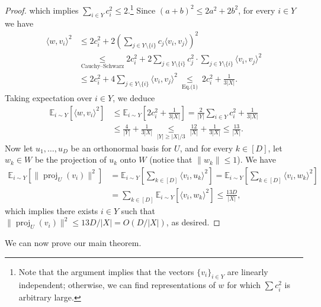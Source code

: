 \begin{proof}
which implies $\sum_{i\in Y}c_i^2\leq2$.\footnote{Note that the argument implies that the vectors $\{v_i\}_{i\in Y}$ are linearly independent; otherwise, we can find representations of $w$ for which $\sum c_i^2$ is arbitrary large.} Since $(a+b)^2\leq2a^2+2b^2$, for every $i\in Y$ we have
\begin{align*}\langle w,v_i\rangle^2&\leq2c_i^2+2\left(\sum_{j\in Y\setminus\{i\}}c_j\langle v_i,v_j\rangle\right)^2\\&\underset{\text{Cauchy--Schwarz}}\leq2c_i^2+2\sum_{j\in Y\setminus\{i\}}c_j^2\cdot\sum_{j\in Y\setminus\{i\}}\langle v_i,v_j\rangle^2\\&\leq2c_i^2+4\sum_{j\in Y\setminus\{i\}}\langle v_i,v_j\rangle^2\ \underset{\text{Eq.(1)}}\leq\ 2c_i^2+\frac1{3|X|}.\end{align*}
Taking expectation over $i\in Y$, we deduce
\begin{align*}\mathbb E_{i\sim Y}[\langle w,v_i\rangle^2]&\leq\mathbb E_{i\sim Y}\left[2c_i^2+\frac1{3|X|}\right]=\frac2{|Y|}\sum_{i\in Y}c_i^2+\frac1{3|X|}\\&\leq\frac4{|Y|}+\frac1{3|X|}\ \underset{|Y|\geq|X|/3}\leq\ \frac{12}{|X|}+\frac1{3|X|}\leq\frac{13}{|X|}.\end{align*}
Now let $u_1,\ldots,u_D$ be an orthonormal basis for $U$, and for every $k\in[D]$, let $w_k\in W$ be the projection of $u_k$ onto $W$ (notice that $\|w_k\|\leq1$). We have
\begin{align*}\mathbb E_{i\sim Y}[\|\operatorname{proj}_U(v_i)\|^2]&=\mathbb E_{i\sim Y}\left[\sum_{k\in[D]}\langle v_i,u_k\rangle^2\right]=\mathbb E_{i\sim Y}\left[\sum_{k\in[D]}\langle v_i,w_k\rangle^2\right]\\&=\sum_{k\in[D]}\mathbb E_{i\sim Y}[\langle v_i,w_k\rangle^2]\leq\frac{13D}{|X|},\end{align*}
which implies there exists $i\in Y$ such that $\|\operatorname{proj}_U(v_i)\|^2\leq13D/|X|=O(D/|X|)$, as desired.
\end{proof}
We can now prove our main theorem.
